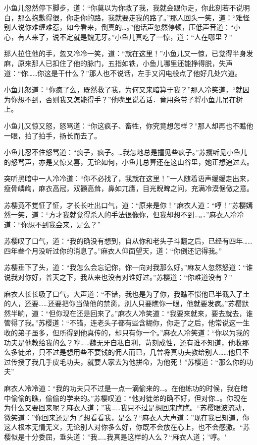 \documentclass[12pt,oneside]{book}
\begin{document}
小鱼儿忽然停下脚步，道：``你莫以为你救了我，我就会跟你走，你此刻若不说明白，那么抱歉得很，你走你的路，我就要走我的路了。''那人回头一笑，道：``难怪别人说你难缠难惹，如今看来，倒真的\ldots。''他话声忽然停顿，压低声音道：``小心，有人来了，说不定就是魏无牙。''小鱼儿真吃了一惊，道：``人在哪里？''

那人拉住他的手，忽又冷冷一笑，道：``就在这里！''小鱼儿又一惊，已觉得半身发麻，原来那人已扣住了他的脉门，五指如铁，小鱼儿哪里还能挣得脱，失声道：``你\ldots\ldots 你这是干什么？''那人也不说话，左手又闪电般点了他好几处穴道。

小鱼儿怒道：``你疯了么，既然救了我，为何又来暗算于我？''那人冷笑道，``就因为你想不到，否则我又怎能得手？''他嘴里说着话．竟用条带子将小鱼儿吊在树上。

小鱼儿又惊又怒，怒骂道：``你这疯子、畜牲，你究竟想怎样？''那人却再也不瞧他一眼，拍了拍手，扬长而去了。

小鱼儿忍不住怒骂道：``疯子，疯子。\ldots 我怎地总是撞见些疯子。''苏攫听见小鱼儿的怒骂声，亦是又惊又喜，无论如何，小鱼儿总算还在这山谷里，她正想追过去。

突听黑暗中一人冷冷道：``你不必找了，我就在这里！''一人随着语声缓缓走出来，瘦骨嶙峋，麻衣高冠，双颧高耸，鼻如兀鹰，目光睨睥之问，充满冷漠倨傲之意。

苏樱竟不觉怔了怔，才长长吐出口气，道：``原来是你！''麻衣人道：``哼！''苏樱嫣然一笑，道：``方才我就觉得杀人的手法很像你，但我却想不到\ldots。．''麻衣人冷冷道：``你想不到我会来，是么？''

苏樱叹了口气，道：``我的确没有想到，自从你和老头子斗翻之后，已经有四年\ldots\ldots 四年叁个月没听过你的消息了。''麻衣人仰面望天，道：``你倒还记得我。''

苏樱垂下了头，道：``我怎么会忘记你，你一向对我那么好。''麻友人忽然怒道：``谁说我对你好，普天之下，我从来也没有对谁好过。''苏樱道：``你难道没有？''

麻衣人长长吸了口气，大声道：``不错，我也是为了你，我瞧不惯他已半截入了土的人，还要\ldots\ldots 还要把你当做他的禁脔，别人只要瞧你一眼，他就要发疯。''苏樱默然半晌，道：``但你现在还是回来了。''麻衣人冷笑道：``我要来就来，要去就去，谁管得了我。''苏樱道：``不错，连老头子都有些含糊你，你走了之后，他常说这一生收的弟子虽多，但所得到他真传的，却只有你一个。''麻衣人冷笑道：``你以为我的功夫是他教给我的么？哼\ldots\ldots 魏无牙自私自利，苛刻成性，还有谁不知道，他收那么多徒弟，只不过是想用些不要钱的佣人而已，几曾将真功夫教给别人\ldots\ldots 他只不过传授了我几手皮毛功夫，就要人家去为他拼命，为他死！''苏樱道：``那么你的功夫''

麻衣人冷冷道：``我的功夫只不过是一点一滴偷来的\ldots。在他练功的时候，我在暗中偷偷的瞧，偷偷的学来的。''苏樱叹道：``他对徒弟的确不好，但对你\ldots。你现在为什么又要回来呢？麻衣人道；''我\ldots\ldots 我只不过是想回来瞧瞧。``苏樱眼波流动，微笑道：''你回来还是为了想看看我，是么？``麻衣人大声道：''现在我已知道，你这人根本无情无义，无论别人对你多么好，你既不会放在心上，也不会感激。``苏樱似是十分委屈，垂头道：''我\ldots\ldots 我真是这样的人么？``麻衣人道；''哼。"
\end{document}
